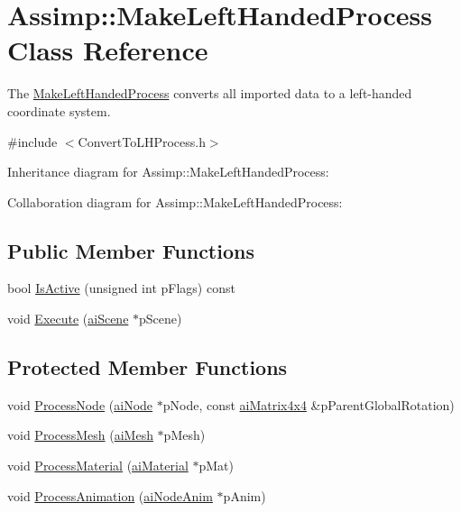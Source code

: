 \hypertarget{class_assimp_1_1_make_left_handed_process}{\section{Assimp\+:\+:Make\+Left\+Handed\+Process Class Reference}
\label{class_assimp_1_1_make_left_handed_process}
}


The \hyperlink{class_assimp_1_1_make_left_handed_process}{Make\+Left\+Handed\+Process} converts all imported data to a left-\/handed coordinate system.  




{\ttfamily \#include $<$Convert\+To\+L\+H\+Process.\+h$>$}



Inheritance diagram for Assimp\+:\+:Make\+Left\+Handed\+Process\+:


Collaboration diagram for Assimp\+:\+:Make\+Left\+Handed\+Process\+:
\subsection*{Public Member Functions}
\begin{DoxyCompactItemize}
\item 
bool \hyperlink{class_assimp_1_1_make_left_handed_process_a494e6bf525fbeaa4e39b05331288cac0}{Is\+Active} (unsigned int p\+Flags) const 
\item 
void \hyperlink{class_assimp_1_1_make_left_handed_process_a65d1b32efd0056e668c2bf3763fa48d2}{Execute} (\hyperlink{structai_scene}{ai\+Scene} $\ast$p\+Scene)
\end{DoxyCompactItemize}
\subsection*{Protected Member Functions}
\begin{DoxyCompactItemize}
\item 
void \hyperlink{class_assimp_1_1_make_left_handed_process_a48e8217838d26ecbfd3b65dbf59639db}{Process\+Node} (\hyperlink{structai_node}{ai\+Node} $\ast$p\+Node, const \hyperlink{structai_matrix4x4}{ai\+Matrix4x4} \&p\+Parent\+Global\+Rotation)
\item 
void \hyperlink{class_assimp_1_1_make_left_handed_process_a8f9b759b8fdd4e31b129d22f40fd8354}{Process\+Mesh} (\hyperlink{structai_mesh}{ai\+Mesh} $\ast$p\+Mesh)
\item 
void \hyperlink{class_assimp_1_1_make_left_handed_process_a9f252439454d2108908172ae9838d274}{Process\+Material} (\hyperlink{classai_material}{ai\+Material} $\ast$p\+Mat)
\item 
void \hyperlink{class_assimp_1_1_make_left_handed_process_a2867082b8689b3aa3869dab31223b8f9}{Process\+Animation} (\hyperlink{structai_node_anim}{ai\+Node\+Anim} $\ast$p\+Anim)
\end{DoxyCompactItemize}
